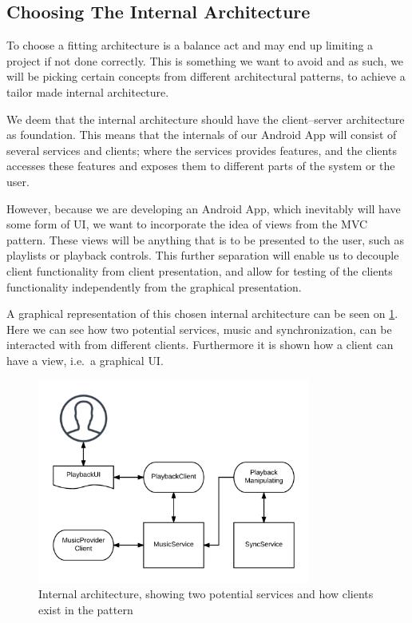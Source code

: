 \subsection{Choosing The Internal Architecture}
To choose a fitting architecture is a balance act and may end up limiting a project if not done correctly.
This is something we want to avoid and as such, we will be picking certain concepts from different architectural patterns, to achieve a tailor made internal architecture.

We deem that the internal architecture should have the client--server architecture as foundation.
This means that the internals of our Android App will consist of several services and clients;
where the services provides features, and the clients accesses these features and exposes them to different parts of the system or the user.

However, because we are developing an Android App, which inevitably will have some form of \ac{UI}, we want to incorporate the idea of views from the \ac{MVC} pattern.
These views will be anything that is to be presented to the user, such as playlists or playback controls.
This further separation will enable us to decouple client functionality from client presentation, and allow for testing of the clients functionality independently from the graphical presentation.

A graphical representation of this chosen internal architecture can be seen on \cref{fig:internal_architecture}.
Here we can see how two potential services, music and synchronization, can be interacted with from different clients.
Furthermore it is shown how a client can have a view, i.e.~a graphical \ac{UI}.

\begin{figure}
    \footnotesize
    \centering
    \includegraphics[width=0.8\textwidth]{img/internal_architecture.png}
    \caption{Internal architecture, showing two potential services and how clients exist in the pattern}\label{fig:internal_architecture}
\end{figure}
